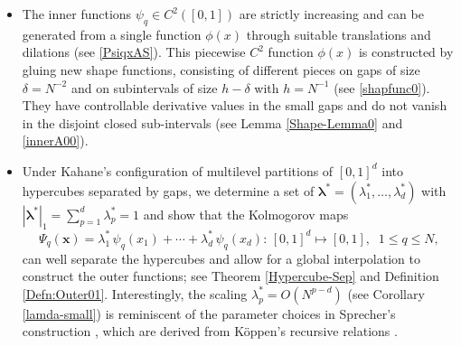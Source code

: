 \documentclass[10pt,reqno,final]{amsart}
\theoremstyle{remark}
\theoremstyle{definition}
\newcommand{\bs}[1]{\boldsymbol{#1}}
\newcommand{\wll}[1]{#1}
\begin{document}
\begin{itemize}
\item[(i)] The inner functions $\psi_q\in C^2([0,1])$ are strictly increasing and can be generated from a single function $\phi(x)$ through suitable translations and dilations 
(see \eqref{PsiqxAS}). \wll{This piecewise $C^2$ function $\phi(x)$ is constructed by gluing new shape functions, consisting of different pieces on gaps of size $\delta=N^{-2}$ and on subintervals of size $h-\delta$ with $h=N^{-1}$ (see \eqref{shapfunc0}). 
 They have controllable derivative values in the small gaps and do not vanish in the disjoint closed sub-intervals (see Lemma \ref{Shape-Lemma0} and \eqref{innerA00}).}
\smallskip
\item[(ii)] Under Kahane’s configuration \cite{Kahane1975} of multilevel partitions of $[0,1]^d$ into hypercubes separated by gaps,
we determine a set of $\bs \lambda^*=(\lambda_1^*,\ldots, \lambda_d^*)$ with 
$|\bs \lambda^*|_1=\sum_{p=1}^d \lambda_p^*=1$  and show that the Kolmogorov maps  
\begin{equation}\label{Psiqq}
\Psi_q(\bs x)=\lambda_1^*\,\psi_q(x_1)+\cdots+ \lambda_d^*\,\psi_q(x_d):\, [0,1]^d\mapsto [0,1],\;\; 1\le q\le N,  
\end{equation}
can well separate the hypercubes and allow for a global interpolation to construct the outer functions; see Theorem \ref{Hypercube-Sep} and  
Definition \ref{Defn:Outer01}.
Interestingly, the scaling $\lambda_p^*=O(N^{p-d})$ 
(see Corollary \ref{lamda-small})  is reminiscent of the parameter choices in Sprecher’s construction \cite{Demb2021note}, which are derived from K\"oppen’s recursive relations \cite{Koppen2002}.  


\end{itemize}
\end{document}
